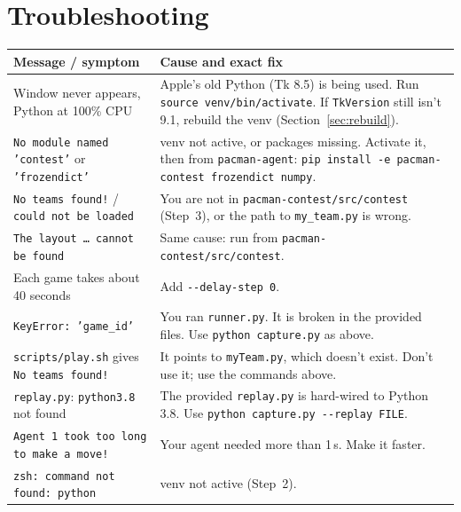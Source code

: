 \documentclass[11pt,a4paper]{article}
\newcommand{\p}[1]{\nolinkurl{#1}}  %
\begin{document}
\section{Troubleshooting}\label{sec:trouble}

\begin{center}
\begin{tabularx}{\linewidth}{@{}>{\raggedright\arraybackslash}p{5.4cm}X@{}}
\toprule
\textbf{Message / symptom} & \textbf{Cause and exact fix} \\
\midrule
Window never appears, Python at 100\% CPU & Apple's old Python (Tk 8.5) is being used. Run \p{source venv/bin/activate}. If \texttt{TkVersion} still isn't 9.1, rebuild the venv (Section~\ref{sec:rebuild}). \\
\texttt{No module named 'contest'} or \texttt{'frozendict'} & venv not active, or packages missing. Activate it, then from \texttt{pacman-agent}: \p{pip install -e pacman-contest frozendict numpy}. \\
\texttt{No teams found!} / \texttt{could not be loaded} & You are not in \p{pacman-contest/src/contest} (Step~3), or the path to \texttt{my\_team.py} is wrong. \\
\texttt{The layout \ldots\ cannot be found} & Same cause: run from \p{pacman-contest/src/contest}. \\
Each game takes about 40 seconds & Add \p{--delay-step 0}. \\
\texttt{KeyError: 'game\_id'} & You ran \texttt{runner.py}. It is broken in the provided files. Use \texttt{python capture.py} as above. \\
\texttt{scripts/play.sh} gives \texttt{No teams found!} & It points to \texttt{myTeam.py}, which doesn't exist. Don't use it; use the commands above. \\
\texttt{replay.py}: \texttt{python3.8} not found & The provided \texttt{replay.py} is hard-wired to Python 3.8. Use \p{python capture.py --replay FILE}. \\
\texttt{Agent 1 took too long to make a move!} & Your agent needed more than 1\,s. Make it faster. \\
\texttt{zsh: command not found: python} & venv not active (Step~2). \\
\bottomrule
\end{tabularx}
\end{center}
\end{document}
